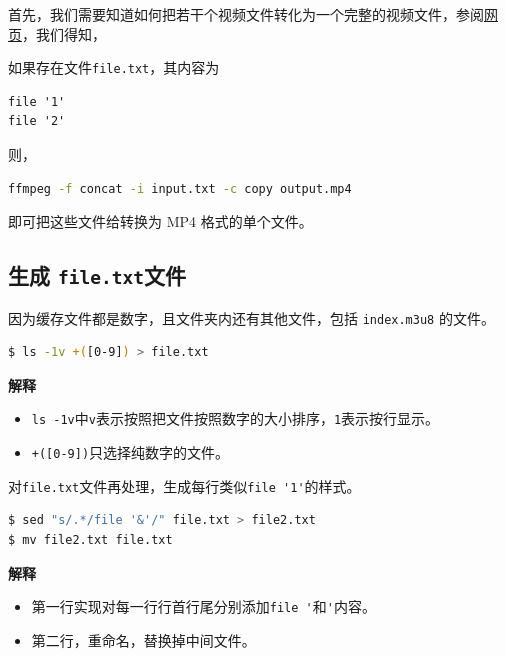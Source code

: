 \documentclass[doctor,openright,twoside]{sjtuthesis}
\providecommand{\tightlist}{%
    \setlength{\itemsep}{0pt}\setlength{\parskip}{0pt}}
\newcommand{\passthrough}[1]{#1}
\theoremstyle{plain}
\theoremstyle{definition}
\theoremstyle{remark}
\theoremstyle{ocrenumbox}
\theoremstyle{plain}
\begin{document}
首先，我们需要知道如何把若干个视频文件转化为一个完整的视频文件，参阅\href{https://stackoverflow.com/questions/14829819/how-to-concatenate-flv-file-into-one}{网页}，我们得知，

如果存在文件\passthrough{\lstinline!file.txt!}，其内容为

\begin{lstlisting}
file '1'
file '2'
\end{lstlisting}

则，

\begin{lstlisting}[language=bash]
ffmpeg -f concat -i input.txt -c copy output.mp4
\end{lstlisting}

即可把这些文件给转换为 MP4 格式的单个文件。

\hypertarget{file.txt}{%
\subsection{\texorpdfstring{生成 \texttt{file.txt}文件}{生成 file.txt文件}}\label{file.txt}}

因为缓存文件都是数字，且文件夹内还有其他文件，包括 \passthrough{\lstinline!index.m3u8!} 的文件。

\begin{lstlisting}[language=bash]
$ ls -1v +([0-9]) > file.txt
\end{lstlisting}

\textbf{解释}

\begin{itemize}
\tightlist
\item
  \passthrough{\lstinline!ls -1v!}中\passthrough{\lstinline!v!}表示按照把文件按照数字的大小排序，\passthrough{\lstinline!1!}表示按行显示。
\item
  \passthrough{\lstinline!+([0-9])!}只选择纯数字的文件。
\end{itemize}

对\passthrough{\lstinline!file.txt!}文件再处理，生成每行类似\passthrough{\lstinline!file '1'!}的样式。

\begin{lstlisting}[language=bash]
$ sed "s/.*/file '&'/" file.txt > file2.txt
$ mv file2.txt file.txt
\end{lstlisting}

\textbf{解释}

\begin{itemize}
\tightlist
\item
  第一行实现对每一行行首行尾分别添加\passthrough{\lstinline!file '!}和\passthrough{\lstinline!'!}内容。
\item
  第二行，重命名，替换掉中间文件。
\end{itemize}
\end{document}
